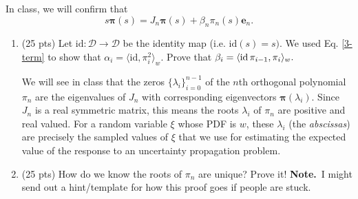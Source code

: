 \documentclass[11pt,letterpaper,twoside]{article}
\begin{document}
\begin{enumerate}
In class, we will confirm that
$$s \bm{\pi}(s) = J_n \bm{\pi}(s) + \beta_n \pi_n(s) \bm{e}_n. $$
\begin{enumerate}
\item (25 pts) Let $\text{id}:\mathcal{D} \rightarrow \mathcal{D}$ be the identity map (i.e. $\text{id}(s) = s).$  We used Eq. \ref{3-term} to show that $\alpha_i = \langle \text{id}, \pi_i^2 \rangle_w$. Prove that $\beta_i = \langle \text{id} \thinspace \pi_{i - 1}, \pi_i \rangle_w.$  

\medskip
We will see in class that the zeros $\{\lambda_i\}_{i=0}^{n-1}$ of the $n$th orthogonal polynomial $\pi_n$ are the eigenvalues of $J_n$ with corresponding eigenvectors $\bm{\pi}(\lambda_i)$. Since $J_n$ is a real symmetric matrix, this means the roots $\lambda_i$ of $\pi_n$ are positive and real valued. For a random variable $\xi$ whose PDF is $w$, these 
$\lambda_i$ (the \emph{abscissas}) are precisely the sampled values of $\xi$ that we use for estimating the expected value of the response to an uncertainty propagation problem. 
\medskip

\item (25 pts) How do we know the roots of $\pi_n$ are unique? Prove it! \textbf{Note.}~I might send out a hint/template for how this proof goes if people are stuck.

\end{enumerate}

\end{enumerate}
\end{document}
